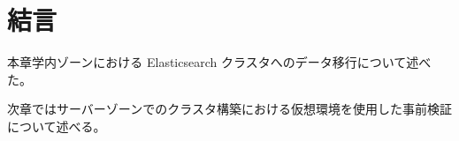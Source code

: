 




\section{結言}
本章学内ゾーンにおける Elasticsearch クラスタへのデータ移行について述べた。

次章ではサーバーゾーンでのクラスタ構築における仮想環境を使用した事前検証について述べる。